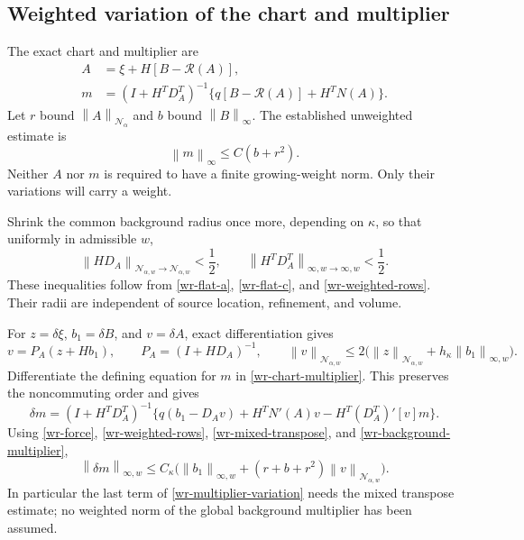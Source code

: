 \documentclass[11pt]{article}
\theoremstyle{remark}
\newcommand{\norm}[1]{\left\|#1\right\|}
\begin{document}
\subsection{Weighted variation of the chart and multiplier}
\label{wr-variation}

The exact chart and multiplier are
\begin{equation}\label{wr-chart-multiplier}
 \begin{split}
 A&=\xi+H[B-\mathcal R(A)],\\
 m&=(I+H^TD_A^T)^{-1}
             \{q[B-\mathcal R(A)]+H^TN(A)\}.
 \end{split}
\end{equation}
Let $r$ bound $\norm{A}_{\mathcal N_\alpha}$ and $b$ bound
$\norm{B}_\infty$. The established unweighted estimate is
\begin{equation}\label{wr-background-multiplier}
 \norm{m}_\infty\le C(b+r^2).
\end{equation}
Neither $A$ nor $m$ is required to have a finite growing-weight
norm. Only their variations will carry a weight.

Shrink the common background radius once more, depending on
$\kappa$, so that uniformly in admissible $w$,
\begin{equation}\label{wr-inverse-smallness}
 \norm{HD_A}_{\mathcal N_{\alpha,w}\to\mathcal N_{\alpha,w}}<\frac12,
 \qquad
 \norm{H^TD_A^T}_{\infty,w\to\infty,w}<\frac12.
\end{equation}
These inequalities follow from \eqref{wr-flat-a},
\eqref{wr-flat-c}, and \eqref{wr-weighted-rows}. Their radii
are independent of source location, refinement, and volume.

For $z=\delta\xi$, $b_1=\delta B$, and $v=\delta A$, exact
differentiation gives
\begin{equation}\label{wr-chart-variation}
 v=P_A(z+Hb_1),\qquad P_A=(I+HD_A)^{-1},\qquad
 \norm{v}_{\mathcal N_{\alpha,w}}
 \le2\bigl(\norm{z}_{\mathcal N_{\alpha,w}}
                       +h_\kappa\norm{b_1}_{\infty,w}\bigr).
\end{equation}
Differentiate the defining equation for $m$ in
\eqref{wr-chart-multiplier}. This preserves the noncommuting
order and gives
\begin{equation}\label{wr-multiplier-variation}
 \boxed{\quad
 \delta m=(I+H^TD_A^T)^{-1}
 \{q(b_1-D_Av)+H^TN'(A)v-H^T(D_A^T)'[v]m\}.
 \quad}
\end{equation}
Using \eqref{wr-force}, \eqref{wr-weighted-rows},
\eqref{wr-mixed-transpose}, and
\eqref{wr-background-multiplier},
\begin{equation}\label{wr-multiplier-variation-bound}
 \norm{\delta m}_{\infty,w}
 \le C_\kappa\bigl(\norm{b_1}_{\infty,w}
        +(r+b+r^2)\norm{v}_{\mathcal N_{\alpha,w}}\bigr).
\end{equation}
In particular the last term of
\eqref{wr-multiplier-variation} needs the mixed transpose
estimate; no weighted norm of the global background multiplier
has been assumed.
\end{document}
